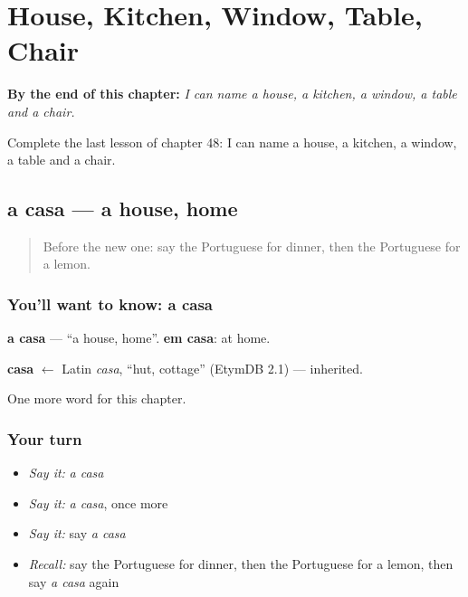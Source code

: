 
\chapter{House, Kitchen, Window, Table, Chair}
\label{ch:pt-house-kitchen-window-table-chair}

\begin{chapteropening}
\textbf{By the end of this chapter:} \emph{I can name a house, a kitchen, a window, a table and a chair.}

Complete the last lesson of chapter 48: I can name a house, a kitchen, a window, a table and a chair.
\end{chapteropening}

\section[a casa]{a casa — a house, home}

\label{lesson:PT-C48-casa}



\begin{quote}
Before the new one: say the Portuguese for dinner, then the Portuguese for a lemon.
\end{quote}

\subsection*{You'll want to know: a casa}
\textbf{a casa} — \textquotedblleft{}a house, home\textquotedblright{}. \textbf{em casa}: at home.

\begin{cousinweb}
\textbf{casa} $\leftarrow$ Latin \emph{casa}, \textquotedblleft{}hut, cottage\textquotedblright{} (EtymDB 2.1) — inherited.
\end{cousinweb}

\begin{grammarlens}[title={What you've built}]
One more word for this chapter.
\end{grammarlens}

\subsection*{Your turn}
\begin{itemize}
\raggedright
  \item \emph{Say it:} \emph{a casa}
  \item \emph{Say it:} \emph{a casa}, once more
  \item \emph{Say it:} say \emph{a casa}
  \item \emph{Recall:} say the Portuguese for dinner, then the Portuguese for a lemon, then say \emph{a casa} again
\end{itemize}

